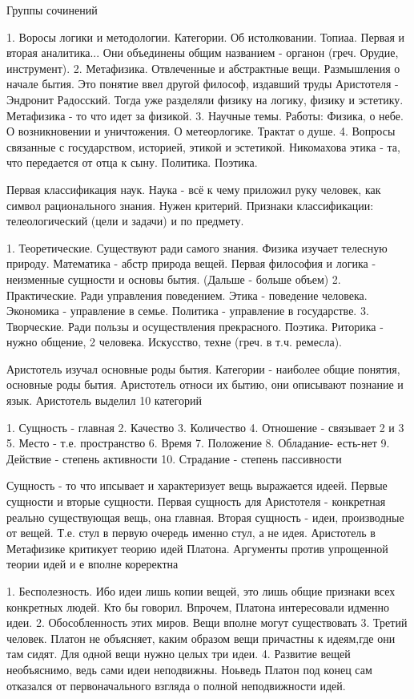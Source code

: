 Группы сочинений

	1. Воросы логики и методологии. Категории. Об истолковании. Топиаа. Первая и вторая аналитика... Они объединены общим названием - органон (греч. Орудие, инструмент).
	2. Метафизика. Отвлеченные и абстрактные вещи.  Размышления о начале бытия. Это понятие ввел другой философ, издавший труды Аристотеля - Эндронит Радосский. Тогда уже разделяли физику на логику, физику и эстетику. Метафизика - то что идет за физикой.
	3. Научные темы. Работы: Физика, о небе. О возникновении и уничтожения. О метеорлогике. Трактат о душе.
	4. Вопросы связанные с государством, историей, этикой и эстетикой. Никомахова этика - та, что передается от отца к сыну. Политика. Поэтика.

Первая классификация наук. Наука - всё к чему приложил руку человек, как символ рационального знания. Нужен критерий. Признаки классификации: телеологический (цели и задачи) и по предмету.

	1. Теоретические. Существуют ради самого знания. Физика изучает телесную природу. Математика - абстр природа вещей. Первая философия и логика - неизменные сущности и основы бытия. (Дальше - больше объем)
	2. Практические. Ради управления поведением. Этика - поведение человека. Экономика - управление в семье. Политика - управление в государстве.
	3. Творческие. Ради пользы и осуществления прекрасного. Поэтика. Риторика - нужно общение, 2 человека. Искусство, техне (греч. в т.ч. ремесла).

Аристотель изучал основные роды бытия. Категории - наиболее общие понятия, основные роды бытия. Аристотель относи их бытию, они описывают познание и язык. 
Аристотель выделил 10 категорий

	1. Сущность - главная
	2. Качество
	3. Количество
	4. Отношение - связывает 2 и 3
	5. Место - т.е. пространство
	6. Время
	7. Положение
	8. Обладание- есть-нет
	9. Действие - степень активности
	10. Страдание - степень пассивности

Сущность - то что ипсывает и характеризует вещь выражается идеей. Первые сущности и вторые сущности. Первая сущность для Аристотеля - конкретная реально существующая вещь, она главная. Вторая сущность - идеи, производные от вещей. Т.е. стул в первую очередь именно стул, а не идея. Аристотель в Метафизике критикует теорию идей Платона. Аргументы против упрощенной теории идей и е вполне кореректна

	1. Бесполезность. Ибо идеи лишь копии вещей, это лишь общие признаки всех конкретных людей. Кто бы говорил. Впрочем, Платона интересовали идменно идеи.
	2. Обособленность этих миров. Вещи вполне могут существовать
	3. Третий человек. Платон не объясняет, каким образом вещи причастны к идеям,где они там сидят. Для одной вещи нужно целых три идеи.
	4. Развитие вещей необъяснимо, ведь сами идеи неподвижны. Ноьведь Платон под конец сам отказался от первоначального взгляда о полной неподвижности идей.

